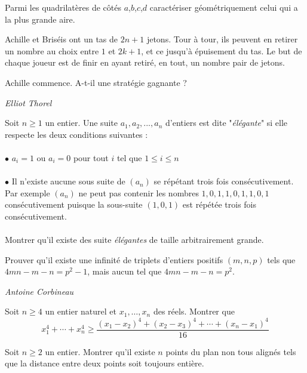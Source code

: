 \begin{exo}{}
Parmi les quadrilatères de côtés
$a$,$b$,$c$,$d$ caractériser géométriquement celui qui a la plus
grande aire.
\end{exo}

\begin{exo}{ }
Achille et Briséis ont un tas de $2n+1$ jetons. Tour à tour, ils peuvent en retirer un nombre au choix entre $1$ et $2k+1$, et ce jusqu'à épuisement du tas. Le but de chaque joueur est de finir en ayant retiré, en tout,
un nombre pair de jetons.

Achille commence. A-t-il une stratégie gagnante ?

\medskip
\textit{Elliot Thorel}
\end{exo}

\begin{exo}{}
Soit $n\ge 1$ un entier. Une suite $a_1,a_2,...,a_n$ d'entiers est dite "\textit{élégante}" si elle respecte les deux conditions suivantes :\\~~\\
$\bullet$ $a_i=1$ ou $a_i=0$ pour tout $i$ tel que $1\le i\le n$\\~~\\
$\bullet$ Il n'existe aucune sous suite de $(a_n)$ se répétant trois fois consécutivement. Par exemple $(a_n)$ ne peut pas contenir les nombres $1,0,1,1,0,1,1,0,1$ consécutivement puisque la sous-suite $(1,0,1)$ est répétée trois fois consécutivement. \\~~\\
Montrer qu'il existe des suite \textit{élégantes} de taille arbitrairement grande.

\end{exo}

\begin{exo}{}
Prouver qu'il existe une infinité de triplets d'entiers positifs $(m,n,p)$ tels que $4mn-m-n=p^2-1$, mais aucun tel que $4mn-m-n=p^2$.

\medskip
\textit{Antoine Corbineau}
\end{exo}

\begin{exo}{}
Soit $n \geq 4$ un entier naturel et $x_1, \dots, x_n$ des réels. Montrer que
$$x_1^4+\cdots+x_n^4 \geq \dfrac{(x_1-x_2)^4+(x_2-x_3)^4+ \cdots +(x_n-x_1)^4}{16}$$\end{exo}


\begin{exo}{}
Soit $n\ge 2$ un entier. Montrer qu'il existe $n$ points du plan non tous alignés tels que la distance entre deux points soit toujours entière.
\end{exo}

